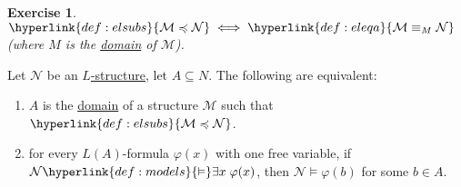 \documentclass{article}
\let\models\vDash
\newtheorem{nexercise}[nthm]{Exercise}
\begin{document}
\begin{nexercise}\label{ex:3.7}
  $ \hyperlink{def:elsubs}{\mathcal{M}\preccurlyeq \mathcal{N}} \iff \hyperlink{def:eleqa}{\mathcal{M} \equiv_M \mathcal{N}}$ (where $M$ is the \hyperlink{def:str}{domain} of $\mathcal{M}$).
\end{nexercise}
\begin{nlemma}\label{lem:3.8}
  Let $\mathcal{N}$ be an \hyperlink{def:str}{$L$-structure}, let $A \subseteq N$. The following are equivalent:
  \begin{enumerate}[label=(\roman*)]
    \item $A$ is the \hyperlink{def:str}{domain} of a structure $\mathcal{M}$ such that $\hyperlink{def:elsubs}{\mathcal{M} \preccurlyeq \mathcal{N}}$.
    \item for every $L(A)$-formula $\varphi(x)$ with one free variable, if $\mathcal{N} \hyperlink{def:models}{\models} \exists x \; \varphi(x)$, then $\mathcal{N} \models \varphi(b)$ for some $b \in A$.
  \end{enumerate}
\end{nlemma}
\end{document}

